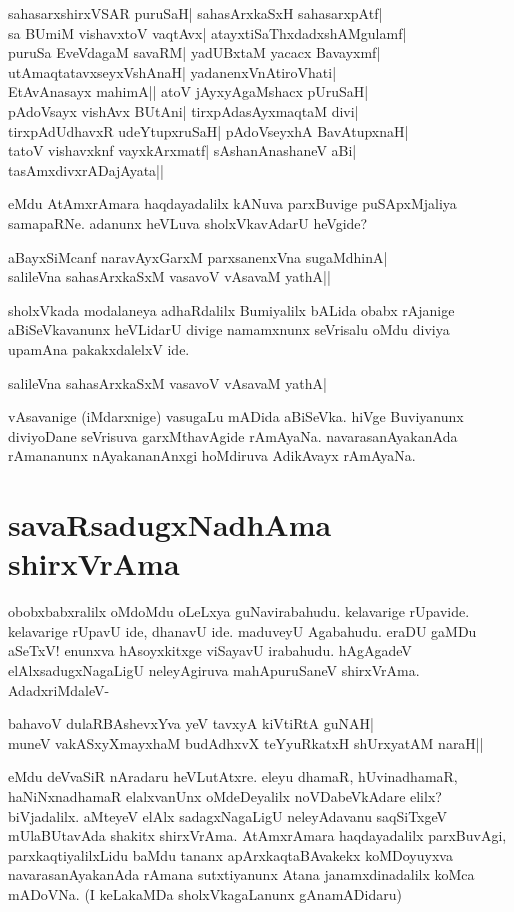 \begin{shloka}
sahasarxshirxVSAR puruSaH| sahasArxkaSxH sahasarxpAtf|\label{218a}\\
sa BUmiM vishavxtoV vaqtAvx| atayxtiSaThxdadxshAMgulamf|\\
puruSa EveVdagaM savaRM| yadUBxtaM yacacx Bavayxmf|\\
utAmaqtatavxseyxVshAnaH| yadanenxVnAtiroVhati|\\
EtAvAnasayx mahimA|| atoV jAyxyAgaMshacx pUruSaH|\\
pAdoV\s sayx vishAvx BUtAni|  tirxpAdasAyxmaqtaM divi|\\
tirxpAdUdhavxR udeYtupxruSaH| pAdoV\s seyxhA BavAtupxnaH|\\
tatoV vishavxknf vayxkArxmatf| sAshanAnashaneV aBi|\\
tasAmxdivxrADajAyata||
\end{shloka}
eMdu AtAmxrAmara haqdayadalilx kANuva parxBuvige puSApxMjaliya samapaRNe. adanunx heVLuva sholxVkavAdarU heVgide?

\begin{shloka}
aBayxSiMcanf naravAyxGarxM parxsanenxVna sugaMdhinA|\\
salileVna sahasArxkaSxM vasavoV vAsavaM yathA||
\end{shloka}

sholxVkada modalaneya adhaRdalilx Bumiyalilx bALida obabx rAjanige aBiSeVkavanunx heVLidarU divige namamxnunx seVrisalu oMdu diviya upamAna pakakxdalelxV ide.

\begin{shloka}
salileVna sahasArxkaSxM vasavoV vAsavaM yathA|\\
\end{shloka}
vAsavanige (iMdarxnige) vasugaLu mADida aBiSeVka. hiVge Buviyanunx diviyoDane seVrisuva garxMthavAgide rAmAyaNa. navarasanAyakanAda rAmananunx nAyakananAnxgi hoMdiruva AdikAvayx rAmAyaNa. 

\section*{savaRsadugxNadhAma shirxVrAma}

obobxbabxralilx oMdoMdu oLeLxya guNavirabahudu. kelavarige rUpavide. kelavarige rUpavU ide, dhanavU ide. maduveyU Agabahudu. eraDU gaMDu aSeTxV! enunxva hAsoyxkitxge viSayavU irabahudu. hAgAgadeV elAlxsadugxNagaLigU neleyAgiruva mahApuruSaneV shirxVrAma. AdadxriMdaleV-

\begin{shloka}
bahavoV dulaRBAshevxYva yeV tavxyA kiVtiRtA guNAH|\label{219a}\\
muneV vakASxyXmayxhaM budAdhxvX teYyuRkatxH shUrxyatAM naraH||
\end{shloka}
eMdu deVvaSiR nAradaru heVLutAtxre. eleyu dhamaR, hUvinadhamaR, haNiNxnadhamaR elalxvanUnx oMdeDeyalilx noVDabeVkAdare elilx? biVjadalilx. aMteyeV elAlx sadagxNagaLigU neleyAdavanu saqSiTxgeV mUlaBUtavAda shakitx shirxVrAma. AtAmxrAmara haqdayadalilx parxBuvAgi, parxkaqtiyalilxLidu baMdu tananx apArxkaqtaBAvakekx koMDoyuyxva navarasanAyakanAda rAmana sutxtiyanunx Atana janamxdinadalilx koMca mADoVNa. (I keLakaMDa sholxVkagaLanunx gAnamADidaru)

